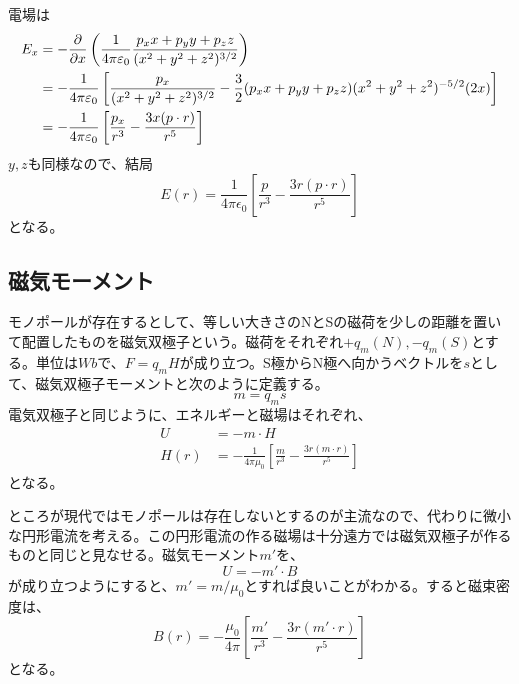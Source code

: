    電場は
    \begin{align*}
        E_x &= -\pdv{x}\left(\frac{1}{4\pi\varepsilon_0}\frac{p_x x + p_y y + p_z z}{(x^2+y^2+z^2)^{3/2}}\right)\\
            &= -\frac{1}{4\pi\varepsilon_0}\left[\frac{p_x}{(x^2 + y^2 + z^2)^{3/2}} - \frac{3}{2}(p_x x + p_y y + p_z z)(x^2 + y^2 + z^2)^{-5/2}(2x)\right]\\
            &= -\frac{1}{4\pi\varepsilon_0}\left[\frac{p_x}{r^3} - \frac{3x(p \cdot r)}{r^5}\right]
    \end{align*}
    $y, z$も同様なので、結局
        \[E(r) = \frac{1}{4\pi\epsilon_0}\left[\frac{p}{r^3} - \frac{3r(p\cdot r)}{r^5}\right]\]
    となる。

\subsection{磁気モーメント}
    モノポールが存在するとして、等しい大きさのNとSの磁荷を少しの距離を置いて配置したものを磁気双極子という。磁荷をそれぞれ$+q_m(N), -q_m(S)$とする。単位は$Wb$で、$F = q_m H$が成り立つ。S極からN極へ向かうベクトルを$s$として、磁気双極子モーメントと次のように定義する。
        \[m = q_m s\]
    電気双極子と同じように、エネルギーと磁場はそれぞれ、
    \begin{align*}
        U &= -m \cdot H\\
        H(r) &= -\frac{1}{4\pi\mu_0}\left[\frac{m}{r^3} - \frac{3r(m\cdot r)}{r^5}\right]
    \end{align*}
    となる。

    ところが現代ではモノポールは存在しないとするのが主流なので、代わりに微小な円形電流を考える。この円形電流の作る磁場は十分遠方では磁気双極子が作るものと同じと見なせる。磁気モーメント$m'$を、
        \[U = -m' \cdot B\]
    が成り立つようにすると、$m' = m / \mu_0$とすれば良いことがわかる。すると磁束密度は、
        \[B(r) = -\frac{\mu_0}{4\pi}\left[\frac{m'}{r^3} - \frac{3r(m'\cdot r)}{r^5}\right]\]
    となる。

